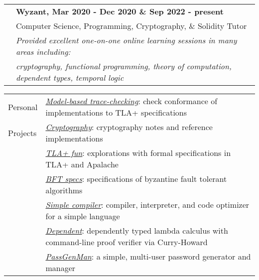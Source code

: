 \documentclass[letterpaper,10pt,oneside]{article}
\begin{document}

\noindent \begin{tabular}{@{} l l}
 \hspace{1.1in} & \textbf{Wyzant, Mar 2020 - Dec 2020 \& Sep 2022 - present} \\
 & Computer Science, Programming, Cryptography, \& Solidity Tutor \\
 & \emph{Provided excellent one-on-one online learning sessions in many areas including:} \\
 & \emph{cryptography, functional programming, theory of computation, dependent types, temporal logic} \\
\end{tabular}

\vfill


\noindent \begin{tabular}{@{} l l}
 \Large{Personal} & \href{https://github.com/Isaac-DeFrain/model-based-trace-checking}{\emph{Model-based trace-checking}}: check conformance of implementations to TLA+ specifications \\
 \Large{Projects} & \href{https://github.com/Isaac-DeFrain/cryptography}{\emph{Cryptography}}: cryptography notes and reference implementations \\
 \hspace{1.1in}  & \href{https://github.com/Isaac-DeFrain/TLAplusFun}{\emph{TLA+ fun}}: explorations with formal specifications in TLA+ and Apalache \\
 & \href{https://github.com/Isaac-DeFrain/bft_specs}{\emph{BFT specs}}: specifications of byzantine fault tolerant algorithms \\
 & \href{https://github.com/Isaac-DeFrain/simple-compiler}{\emph{Simple compiler}}: compiler, interpreter, and code optimizer for a simple language \\
 & \href{https://github.com/Isaac-DeFrain/dependent}{\emph{Dependent}}: dependently typed lambda calculus with command-line proof verifier via Curry-Howard \\
 & \href{https://github.com/Isaac-DeFrain/PassGenMan}{\emph{PassGenMan}}: a simple, multi-user password generator and manager \\
\end{tabular}

\vfill
\end{document}
